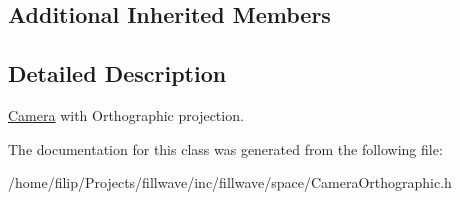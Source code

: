 \subsection*{Additional Inherited Members}


\subsection{Detailed Description}
\hyperlink{classfillwave_1_1space_1_1Camera}{Camera} with Orthographic projection. 

The documentation for this class was generated from the following file\+:\begin{DoxyCompactItemize}
\item 
/home/filip/\+Projects/fillwave/inc/fillwave/space/Camera\+Orthographic.\+h\end{DoxyCompactItemize}
